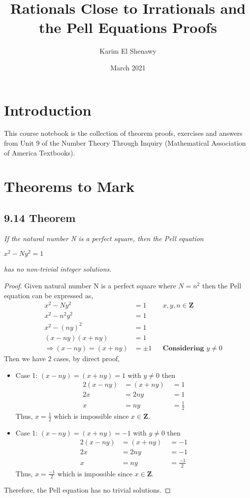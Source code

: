 \documentclass{article}
\title{Rationals Close to Irrationals and the Pell Equations Proofs}
\author{Karim El Shenawy}
\date{March 2021}
\begin{document}
\maketitle

\section*{Introduction}
This course notebook is the collection of theorem proofs, exercises and answers from Unit 9 of the Number Theory Through Inquiry (Mathematical Association of America Textbooks).

\section*{Theorems to Mark}

\subsection*{9.14 Theorem} 
\quad \textit{If the natural number N is a perfect square, then the Pell equation}
\begin{center}
    $x^2-Ny^2 = 1$
\end{center}
\textit{has no non-trivial integer solutions.}

\begin{proof}
Given natural number N is a perfect square where $N = n^2$ then the Pell equation can be expressed as,
\begin{align*}
    &&x^2 - Ny^2 &= 1 && x,y,n \in \mathbf{Z}\\
    &&x^2 - n^2y^2 &= 1 &&\\
    &&x^2 - (ny)^2 &= 1 &&\\
    &&(x - ny)(x + ny) &= 1 &&\\
    &&\Longrightarrow (x - ny) = (x + ny) &= \pm 1&& \textbf{Considering $y \neq 0$}
\end{align*}
Then we have 2 cases, by direct proof,
\begin{itemize}
    \item Case 1: $(x - ny) = (x + ny) = 1$ with $y \neq 0$ then
    \begin{alignat*}{2}
        (x - ny) &= (x+ny) \;&= 1\\
        2x &= 2ny \;&= 1\\
        x &= ny \;&= \frac{1}{2}
    \end{alignat*}
    Thus, $x = \frac{1}{2} $ which is impossible since $x \in \mathbf{Z}$.
    \item Case 1: $(x - ny) = (x + ny) = -1$ with $y \neq 0$ then
    \begin{alignat*}{2}
        (x - ny) &= (x+ny) \;&= -1\\
        2x &= 2ny \;&= -1\\
        x &= ny \;&= \frac{-1}{2}
    \end{alignat*}
    Thus, $x = \frac{-1}{2} $ which is impossible since $x \in \mathbf{Z}$.
\end{itemize}
Therefore, the Pell equation has no trivial solutions.
\end{proof}
\end{document}

